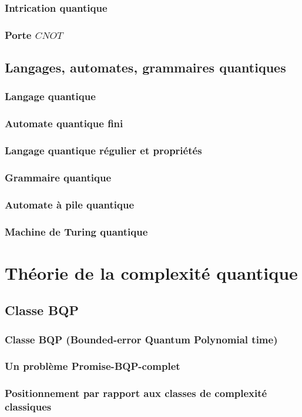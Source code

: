 \documentclass[aspectratio=169]{beamer}
\begin{document}
\begin{frame}
    \frametitle{Intrication quantique}
\end{frame}

\begin{frame}
    \frametitle{Porte $CNOT$}
\end{frame}

\subsection{Langages, automates, grammaires quantiques}
\begin{frame}
    \frametitle{Langage quantique}
\end{frame}

\begin{frame}
    \frametitle{Automate quantique fini}
\end{frame}

\begin{frame}
    \frametitle{Langage quantique régulier et propriétés}
\end{frame}

\begin{frame}
    \frametitle{Grammaire quantique}
\end{frame}

\begin{frame}
    \frametitle{Automate à pile quantique}
\end{frame}

\begin{frame}
    \frametitle{Machine de Turing quantique}
\end{frame}

\section{Théorie de la complexité quantique}
\subsection{Classe BQP}
\begin{frame}
    \frametitle{Classe BQP (Bounded-error Quantum Polynomial time)}
\end{frame}

\begin{frame}
    \frametitle{Un problème Promise-BQP-complet}
\end{frame}

\begin{frame}
    \frametitle{Positionnement par rapport aux classes de complexité classiques}
\end{frame}
\end{document}
